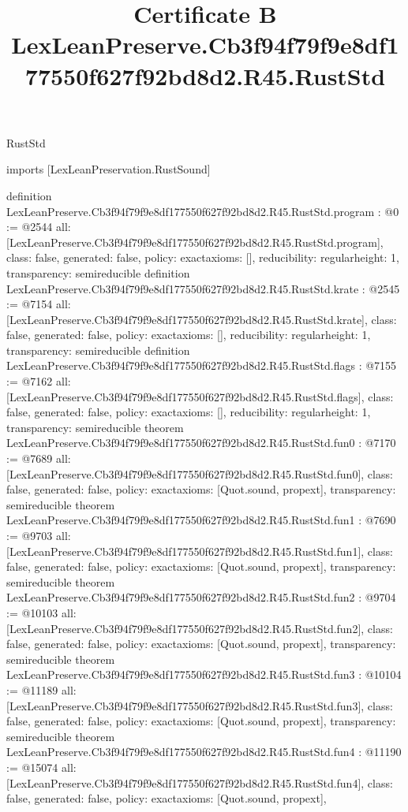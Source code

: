 \begin{lexlean}{RustStd}
\title{Certificate B LexLeanPreserve.Cb3f94f79f9e8df177550f627f92bd8d2.R45.RustStd}
\begin{coremodule}
imports [LexLeanPreservation.RustSound]

definition LexLeanPreserve.Cb3f94f79f9e8df177550f627f92bd8d2.R45.RustStd.program : @0 := @2544 {
  all: [LexLeanPreserve.Cb3f94f79f9e8df177550f627f92bd8d2.R45.RustStd.program],
  class: false,
  generated: false,
  policy: exact{axioms: []},
  reducibility: regular{height: 1},
  transparency: semireducible
}
definition LexLeanPreserve.Cb3f94f79f9e8df177550f627f92bd8d2.R45.RustStd.krate : @2545 := @7154 {
  all: [LexLeanPreserve.Cb3f94f79f9e8df177550f627f92bd8d2.R45.RustStd.krate],
  class: false,
  generated: false,
  policy: exact{axioms: []},
  reducibility: regular{height: 1},
  transparency: semireducible
}
definition LexLeanPreserve.Cb3f94f79f9e8df177550f627f92bd8d2.R45.RustStd.flags : @7155 := @7162 {
  all: [LexLeanPreserve.Cb3f94f79f9e8df177550f627f92bd8d2.R45.RustStd.flags],
  class: false,
  generated: false,
  policy: exact{axioms: []},
  reducibility: regular{height: 1},
  transparency: semireducible
}
theorem LexLeanPreserve.Cb3f94f79f9e8df177550f627f92bd8d2.R45.RustStd.fun0 : @7170 := @7689 {
  all: [LexLeanPreserve.Cb3f94f79f9e8df177550f627f92bd8d2.R45.RustStd.fun0],
  class: false,
  generated: false,
  policy: exact{axioms: [Quot.sound, propext]},
  transparency: semireducible
}
theorem LexLeanPreserve.Cb3f94f79f9e8df177550f627f92bd8d2.R45.RustStd.fun1 : @7690 := @9703 {
  all: [LexLeanPreserve.Cb3f94f79f9e8df177550f627f92bd8d2.R45.RustStd.fun1],
  class: false,
  generated: false,
  policy: exact{axioms: [Quot.sound, propext]},
  transparency: semireducible
}
theorem LexLeanPreserve.Cb3f94f79f9e8df177550f627f92bd8d2.R45.RustStd.fun2 : @9704 := @10103 {
  all: [LexLeanPreserve.Cb3f94f79f9e8df177550f627f92bd8d2.R45.RustStd.fun2],
  class: false,
  generated: false,
  policy: exact{axioms: [Quot.sound, propext]},
  transparency: semireducible
}
theorem LexLeanPreserve.Cb3f94f79f9e8df177550f627f92bd8d2.R45.RustStd.fun3 : @10104 := @11189 {
  all: [LexLeanPreserve.Cb3f94f79f9e8df177550f627f92bd8d2.R45.RustStd.fun3],
  class: false,
  generated: false,
  policy: exact{axioms: [Quot.sound, propext]},
  transparency: semireducible
}
theorem LexLeanPreserve.Cb3f94f79f9e8df177550f627f92bd8d2.R45.RustStd.fun4 : @11190 := @15074 {
  all: [LexLeanPreserve.Cb3f94f79f9e8df177550f627f92bd8d2.R45.RustStd.fun4],
  class: false,
  generated: false,
  policy: exact{axioms: [Quot.sound, propext]},
}
\end{coremodule}
\end{lexlean}
